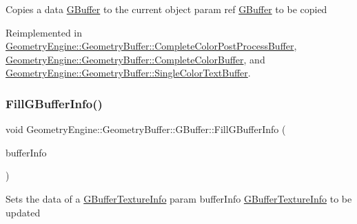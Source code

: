 Copies a data \mbox{\hyperlink{class_geometry_engine_1_1_geometry_buffer_1_1_g_buffer}{G\+Buffer}} to the current object param ref \mbox{\hyperlink{class_geometry_engine_1_1_geometry_buffer_1_1_g_buffer}{G\+Buffer}} to be copied 

Reimplemented in \mbox{\hyperlink{class_geometry_engine_1_1_geometry_buffer_1_1_complete_color_post_process_buffer_ac7d1a90658b1a2f59674b76685e8b052}{Geometry\+Engine\+::\+Geometry\+Buffer\+::\+Complete\+Color\+Post\+Process\+Buffer}}, \mbox{\hyperlink{class_geometry_engine_1_1_geometry_buffer_1_1_complete_color_buffer_a0630be352a9267083d42802fb22ae36b}{Geometry\+Engine\+::\+Geometry\+Buffer\+::\+Complete\+Color\+Buffer}}, and \mbox{\hyperlink{class_geometry_engine_1_1_geometry_buffer_1_1_single_color_text_buffer_a6e266272638dd67cec7b6d57f172eae2}{Geometry\+Engine\+::\+Geometry\+Buffer\+::\+Single\+Color\+Text\+Buffer}}.

\mbox{\label{class_geometry_engine_1_1_geometry_buffer_1_1_g_buffer_ad1242e69d277b69b58497f7d489e176c}} 
\subsubsection{\texorpdfstring{FillGBufferInfo()}{FillGBufferInfo()}}
{\footnotesize\ttfamily void Geometry\+Engine\+::\+Geometry\+Buffer\+::\+G\+Buffer\+::\+Fill\+G\+Buffer\+Info (\begin{DoxyParamCaption}\item[{\mbox{\hyperlink{struct_geometry_engine_1_1_g_buffer_texture_info}{G\+Buffer\+Texture\+Info}} \&}]{buffer\+Info }\end{DoxyParamCaption})}

Sets the data of a \mbox{\hyperlink{struct_geometry_engine_1_1_g_buffer_texture_info}{G\+Buffer\+Texture\+Info}} param buffer\+Info \mbox{\hyperlink{struct_geometry_engine_1_1_g_buffer_texture_info}{G\+Buffer\+Texture\+Info}} to be updated \mbox{\label{class_geometry_engine_1_1_geometry_buffer_1_1_g_buffer_a47bda4849000d2728538de4e2f27f11a}} 
